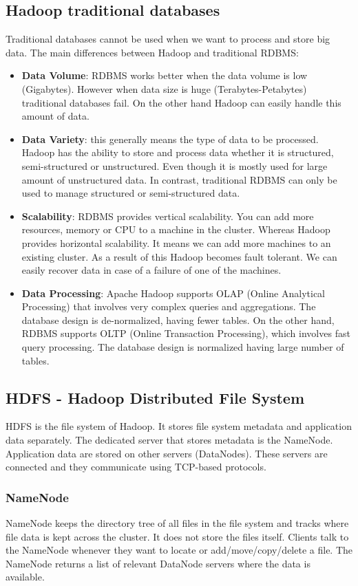 \subsection{Hadoop \vs traditional databases}
Traditional databases cannot be used when we want to process and store big data. The main differences between Hadoop and traditional RDBMS:
\begin{itemize}
	\item \textbf{Data Volume}: RDBMS works better when the data volume is low (Gigabytes). However when data size is huge (Terabytes-Petabytes) traditional databases fail. On the other hand Hadoop can easily handle this amount of data.
	\item \textbf{Data Variety}: this generally means the type of data to be processed. Hadoop has the ability to store and process data whether it is structured, semi-structured or unstructured. Even though  it is mostly used for large amount of unstructured data. 
	In contrast, traditional RDBMS can only be used to manage structured or semi-structured data. 
	\item \textbf{Scalability}: RDBMS provides vertical scalability. You can add more resources, memory or CPU to a machine in the cluster. Whereas Hadoop provides horizontal scalability. It means we can add more machines to an existing cluster. As a result of this Hadoop becomes fault tolerant. We can easily recover data in case of a failure of one of the machines.
	\item \textbf{Data Processing}: Apache Hadoop supports OLAP (Online Analytical Processing) that involves very complex queries and aggregations. The database design is de-normalized, having fewer tables. On the other hand, RDBMS supports OLTP (Online Transaction Processing), which involves fast query processing. The database design is normalized having large number of tables. \cite{Hadoop-vs-RDBMS}
\end{itemize}
\subsection{HDFS - Hadoop Distributed File System}
HDFS is the file system of Hadoop. It stores file system metadata and application data separately. The dedicated server that stores metadata is the NameNode. Application data are stored on other servers (DataNodes). These servers are connected and they communicate using TCP-based protocols. 
\subsubsection*{NameNode \cite{Secondary-NameNode}}
NameNode keeps the directory tree of all files in the file system and tracks where file data is kept across the cluster. It does not store the files itself. Clients talk to the NameNode whenever they want to locate or add/move/copy/delete a file. The NameNode returns a list of relevant DataNode servers where the data is available. 

